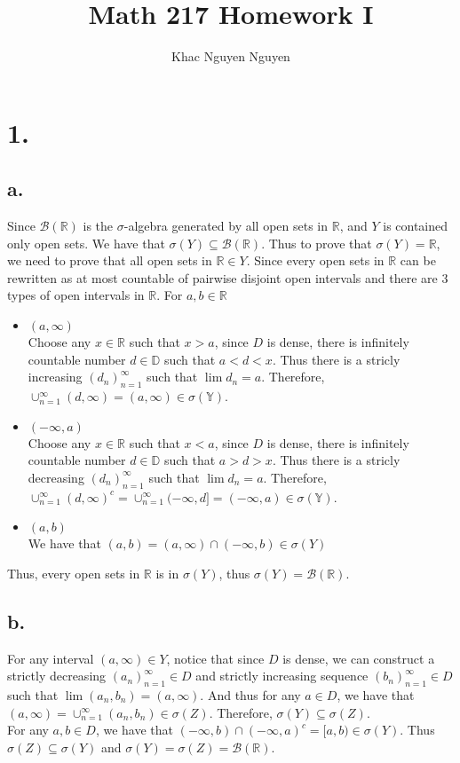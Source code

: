 \documentclass[11pt]{article}
\title{\textbf{Math 217 Homework I}}
\author{Khac Nguyen Nguyen}
\date{}
\theoremstyle{mystyle}
\theoremstyle{definition}
\begin{document}
\section*{1.}
\subsection*{a.}
Since $\mathcal{B}(\mathbb{R})$ is the $\sigma$-algebra generated by all open sets in $\mathbb{R}$, and $Y$ is contained only open sets. We have that $\sigma(Y) \subseteq \mathcal{B}(\mathbb{R})$. Thus to prove that $\sigma(Y) = \mathbb{R}$, we need to prove that all open sets in $\mathbb{R} \in Y$. Since every open sets in $\mathbb{R}$ can be rewritten as at most countable of pairwise disjoint open intervals and there are 3 types of open intervals in $\mathbb{R}$. For $a, b \in \mathbb{R}$ 
\begin{itemize}
  \item $(a,\infty)$ \\
    Choose any $x \in \mathbb{R}$ such that $x>a$, since $D$ is dense, there is infinitely countable number $d \in \mathbb{D}$ such that $a<d<x$. Thus there is a stricly increasing $(d_n)_{n=1}^\infty$ such that $\lim d_n = a$. Therefore, $\cup_{n=1}^\infty (d, \infty) = (a, \infty) \in \sigma(\mathbb{Y})$.    
  \item $(-\infty, a)$ \\
    Choose any $x \in \mathbb{R}$ such that $x<a$, since $D$ is dense, there is infinitely countable number $d \in \mathbb{D}$ such that $a>d>x$. Thus there is a stricly decreasing $(d_n)_{n=1}^\infty$ such that $\lim d_n = a$. Therefore, $\cup_{n=1}^\infty (d, \infty)^c = \cup_{n=1}^\infty (-\infty, d] = (-\infty, a) \in \sigma(\mathbb{Y})$.    
  \item $(a, b)$ \\
    We have that $(a,b) = (a, \infty) \cap (-\infty, b) \in \sigma(Y)$
\end{itemize}
Thus, every open sets in $\mathbb{R}$ is in $\sigma(Y)$, thus $\sigma(Y) = \mathcal{B}(\mathbb{R})$. 
\subsection*{b.}
For any interval $(a, \infty) \in Y$,  notice that since $D$ is dense, we can construct a strictly decreasing $(a_n)_{n=1}^\infty \in D$ and strictly increasing sequence $(b_n)_{n=1}^\infty \in D$ such that $\lim (a_n, b_n) = (a, \infty)$. And thus for any $a \in D$, we have that $(a, \infty) = \cup_{n=1}^\infty (a_n, b_n) \in \sigma(Z)$. Therefore, $\sigma(Y) \subseteq \sigma(Z)$. \\
For any $a, b \in D$, we have that $(-\infty, b) \cap (-\infty, a)^c = [a, b) \in \sigma(Y)$. Thus $\sigma(Z) \subseteq \sigma(Y)$ and $\sigma(Y) = \sigma(Z) = \mathcal{B}(\mathbb{R})$.  
\end{document}
